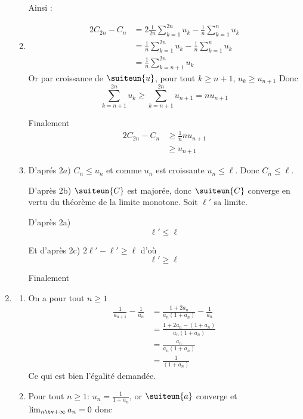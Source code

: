\begin{correction}
\begin{enumerate}
\begin{enumerate}
Ainsi :


\item \begin{eqnarray}
2 C_{2n}-C_n &= 2 \frac{1}{2n }\sum_{k=1}^{2n} u_k - \frac{1}{n }\sum_{k=1}^{n} u_k\\
					&= \frac{1}{n }\sum_{k=1}^{2n} u_k - \frac{1}{n }\sum_{k=1}^{n} u_k\\
				&= \frac{1}{n }\sum_{k=n+1}^{2n} u_k 
\end{eqnarray}
Or par croissance de $\suiteun{u}$, pour tout $k\geq n+1$, $u_k\geq u_{n+1}$ Donc  
$$\sum_{k=n+1}^{2n} u_k  \geq \sum_{k=n+1}^{2n} u_{n+1} = nu_{n+1}$$

Finalement 
\begin{eqnarray*}
2 C_{2n}-C_n &\geq \frac{1}{n }nu_{n+1}\\ 
					&\geq u_{n+1}
\end{eqnarray*}


\item D'aprés $2a)$ $C_n \leq u_n$ et comme $u_n $ est croissante $u_n\leq \ell$. Donc $C_n\leq \ell$. 

D'après 2b) $\suiteun{C} $ est majorée, donc $\suiteun{C}$ converge en vertu du théorème de la limite monotone.  Soit $\ell'$ sa limite. 

D'après 2a) $$\ell' \leq \ell$$

Et d'après 2c) $2 \ell' - \ell' \geq \ell $ d'où $$\ell' \geq \ell$$

Finalement




\end{enumerate}
\item \begin{enumerate}
\item On a pour tout $n\geq 1$
\begin{eqnarray*}
\frac{1}{a_{n+1}} -\frac{1}{a_n} &= \frac{1+2a_n}{a_n(1+a_n)} -\frac{1}{a_n}\\
&= \frac{1+2a_n - (1+a_n)}{a_n(1+a_n)} \\
&= \frac{a_n}{a_n(1+a_n)} \\
&= \frac{1}{(1+a_n)} 
\end{eqnarray*}
Ce qui est bien l'égalité demandée. 
\item Pour tout $n\geq 1$:  $u_n =\frac{1}{1+a_n}$, or $\suiteun{a}$ converge et $\lim_{n\tv+\infty} a_n =0$ donc 


\end{enumerate}
\end{enumerate}
\end{correction}
